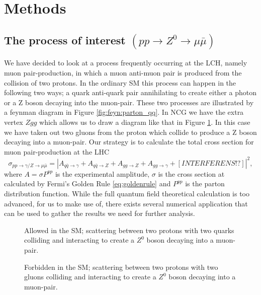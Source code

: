 \section{Methods}

\subsection{The process of interest $(pp \rightarrow Z^0 \rightarrow \mu \bar\mu)$}
We have decided to look at a process frequently occurring at the LCH, namely muon pair-production, in which a muon anti-muon pair is produced from the collision of two protons. In the ordinary SM this process can happen in the following two ways; a quark anti-quark pair annihilating to create either a photon or a Z boson decaying into the muon-pair. These two processes are illustrated by a feynman diagram in Figure \ref{fig:feyn:parton_qq}. In NCG we have the extra vertex $Zgg$ which allows us to draw a diagram like that in Figure \ref{fig:feyn:parton_gg}. In this case we have taken out two gluons from the proton which collide to produce a Z boson decaying into a muon-pair. Our strategy is to calculate the total cross section for muon pair-production at the LHC
\begin{equation}
	\sigma_{pp \rightarrow \gamma/ Z \rightarrow \mu \bar \mu} = |A_{q \bar q \rightarrow \gamma} + A_{q \bar q \rightarrow Z} + A_{gg \rightarrow Z} + A_{gg \rightarrow \gamma} + [INTERFERENS!?]|^{2},
\end{equation}
where $A = \sigma P^{pp}$ is the experimental amplitude, $\sigma$ is the cross section at calculated by Fermi's Golden Rule \eqref{eq:goldenrule} and $P^{pp}$ is the parton distribution function. While the full quantum field theoretical calculation is too advanced, for us to make use of, there exists several numerical application that can be used to gather the results we need for further analysis.

\begin{figure}[htp]
	\centering
	\begin{minipage}[b]{0.475\linewidth} 
    \centering
	  
	  \caption{Allowed in the SM; scattering between two protons with two quarks colliding and interacting to create a $Z^0$ boson decaying into a muon-pair.} \label{fig:feyn:parton_qq}
	\end{minipage}
	\hspace{0.5cm}
	\begin{minipage}[b]{0.475\linewidth} 
    \centering
	  
	  \caption{Forbidden in the SM; scattering between two protons with two gluons colliding and interacting to create a $Z^0$ boson decaying into a muon-pair.} \label{fig:feyn:parton_gg}%
	\end{minipage}
\end{figure}


